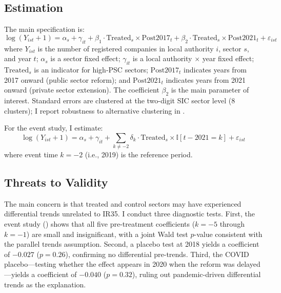 \documentclass[12pt]{article}
\newcommand{\ind}{\mathbb{I}}
\begin{document}
\subsection{Estimation}

The main specification is:
\begin{equation}
\log(Y_{ist} + 1) = \alpha_s + \gamma_{it} + \beta_1 \cdot \text{Treated}_s \times \text{Post2017}_t + \beta_2 \cdot \text{Treated}_s \times \text{Post2021}_t + \varepsilon_{ist}
\label{eq:main}
\end{equation}
where $Y_{ist}$ is the number of registered companies in local authority $i$, sector $s$, and year $t$; $\alpha_s$ is a sector fixed effect; $\gamma_{it}$ is a local authority $\times$ year fixed effect; $\text{Treated}_s$ is an indicator for high-PSC sectors; $\text{Post2017}_t$ indicates years from 2017 onward (public sector reform); and $\text{Post2021}_t$ indicates years from 2021 onward (private sector extension). The coefficient $\beta_2$ is the main parameter of interest. Standard errors are clustered at the two-digit SIC sector level (8 clusters); I report robustness to alternative clustering in .

For the event study, I estimate:
\begin{equation}
\log(Y_{ist} + 1) = \alpha_s + \gamma_{it} + \sum_{k \neq -2} \delta_k \cdot \text{Treated}_s \times \ind[t - 2021 = k] + \varepsilon_{ist}
\label{eq:eventstudy}
\end{equation}
where event time $k = -2$ (i.e., 2019) is the reference period.

\subsection{Threats to Validity}

The main concern is that treated and control sectors may have experienced differential trends unrelated to IR35. I conduct three diagnostic tests. First, the event study () shows that all five pre-treatment coefficients ($k = -5$ through $k = -1$) are small and insignificant, with a joint Wald test $p$-value consistent with the parallel trends assumption. Second, a placebo test at 2018 yields a coefficient of $-0.027$ ($p = 0.26$), confirming no differential pre-trends. Third, the COVID placebo---testing whether the effect appears in 2020 when the reform was delayed---yields a coefficient of $-0.040$ ($p = 0.32$), ruling out pandemic-driven differential trends as the explanation.
\end{document}
